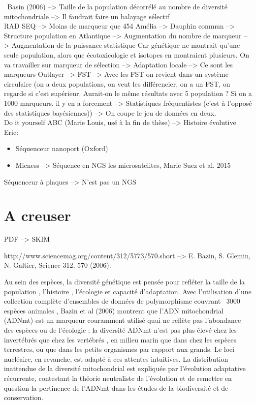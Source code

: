 \documentclass[a4paper]{article}
\begin{document}
~Basin (2006) --> Taille de la population décorrélé au nombre de diversité mitochondriale --> Il faudrait faire un balayage sélectif
~~\\
RAD SEQ --> Moins de marqueur que 454
Amélia --> Dauphin commun --> Structure population en Atlantique --> Augmentation du nombre de marqueur --> Augmentation de la puissance statistique
Car génétique ne montrait qu'une seule population, alors que écotoxicologie et isotopes en montraient plusieurs.
On va travailler sur marqueur de sélection --> Adaptation locale --> Ce sont les marqueurs Outlayer --> FST --> Avec les FST on revient dans un système circulaire (on a deux populations, on veut les différencier, on a un FST, on regarde si c'est supérieur. Aurait-on le même résultats avec 5 population ? Si on a 1000 marqueurs, il y en a forcement --> Statistiques fréquentistes (c'est à l'opposé des statistiques bayésiennes))
--> On coupe le jeu de données en deux.
~~\\
Do it yourself ABC (Marie Louis, usé à la fin de thèse)
--> Histoire évolutive
~~\\
Eric: 
\begin{itemize}
\item Séquenceur nanoport (Oxford)
\item Micness --> Séquence en NGS les microsatelites, Marie Suez et al. 2015
\end{itemize}

Séquenceur à plaques --> N'est pas un NGS

\section{A creuser}

PDF --> SKIM

http://www.sciencemag.org/content/312/5773/570.short --> E. Bazin, S. Glemin, N. Galtier, Science 312, 570 (2006).

Au sein des espèces, la diversité génétique est pensée pour refléter la taille de la population , l'histoire , l'écologie et capacité d'adaptation. Avec l'utilisation d'une collection complète d'ensembles de données de polymorphisme couvrant ~3000 espèces animales , Bazin et al (2006) montrent que l'ADN mitochondrial (ADNmt) est un marqueur couramment utilisé quui ne reflète pas l'abondance des espèces ou de l'écologie : la diversité ADNmt n'est pas plus élevé chez les invertébrés que chez les vertébrés , en milieu marin que dans chez les espèces terrestres, ou que dans les petits organismes par rapport aux grands. Le loci nucléaire, en revanche, est adapté à ces attentes intuitives. La distribution inattendue de la diversité mitochondrial est expliquée par l'évolution adaptative récurrente, contestant la théorie neutraliste de l'évolution et de remettre en question la pertinence de l'ADNmt dans les études de la biodiversité et de conservation.
\end{document}
